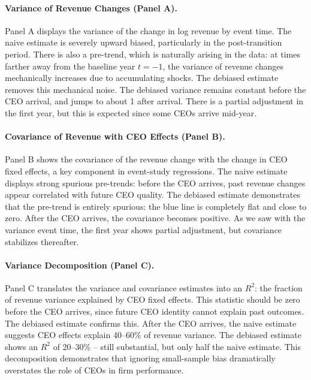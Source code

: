 \documentclass[11pt,a4paper]{article}
\begin{document}
\paragraph{Variance of Revenue Changes (Panel A).} Panel A displays the variance of the change in log revenue by event time. The naive estimate is severely upward biased, particularly in the post-transition period. There is also a pre-trend, which is naturally arising in the data: at times farther away from the baseline year $t=-1$, the variance of revenue changes mechanically increases due to accumulating shocks. The debiased estimate  removes this mechanical noise. The debiased variance remains constant before the CEO arrival, and jumps to about 1 after arrival. There is a partial adjustment in the first year, but this is expected since some CEOs arrive mid-year. 

\paragraph{Covariance of Revenue with CEO Effects (Panel B).} Panel B shows the covariance of the revenue change with the change in CEO fixed effects, a key component in event-study regressions. The naive estimate displays strong spurious pre-trends: before the CEO arrives, past revenue changes appear correlated with future CEO quality. The debiased estimate demonstrates that the pre-trend is entirely spurious: the blue line is completely flat and close to zero. After the CEO arrives, the covariance becomes positive. As we saw with the variance event time, the first year shows partial adjustment, but covariance stabilizes thereafter.

\paragraph{Variance Decomposition (Panel C).} Panel C translates the variance and covariance estimates into an $R^2$: the fraction of revenue variance explained by CEO fixed effects. This statistic should be zero before the CEO arrives, since future CEO identity cannot explain past outcomes. The debiased estimate confirms this. After the CEO arrives, the naive estimate suggests CEO effects explain 40--60\% of revenue variance. The debiased estimate shows an $R^2$ of 20--30\% -- still substantial, but only half the naive estimate. This decomposition demonstrates that ignoring small-sample bias dramatically overstates the role of CEOs in firm performance.
\end{document}
